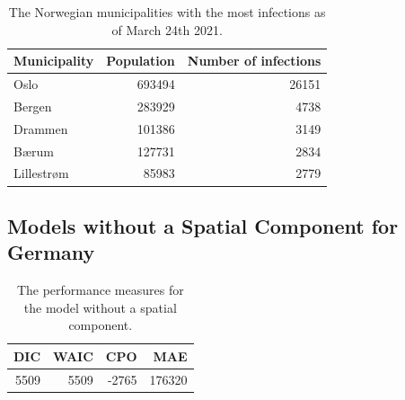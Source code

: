 \begin{table}[H] 
\caption{The Norwegian municipalities with the most infections as of March 24th 2021. \label{top5norway}}
\begin{tabular}{l r r}
\toprule
\textbf{Municipality}	& \textbf{Population}	& \textbf{Number of infections} \\
\midrule
Oslo & 693494 & 26151 \\
Bergen & 283929 & 4738 \\
Drammen & 101386 & 3149 \\
Bærum & 127731 & 2834 \\
Lillestrøm & 85983 & 2779 \\
\bottomrule
\end{tabular}
\end{table}
\subsection{Models without a Spatial Component for Germany}\label{sec:nospatial_germany}
\begin{table}[H] 
\caption{The performance measures for the model without a spatial component. \label{allGermany_nospatial}}
\begin{tabular}{r r r r}
\toprule
\textbf{DIC}	& \textbf{WAIC} & \textbf{CPO} & \textbf{MAE}\\
\midrule
5509 & 5509 & -2765 &  176320 \\
\bottomrule
\end{tabular}
\end{table}
